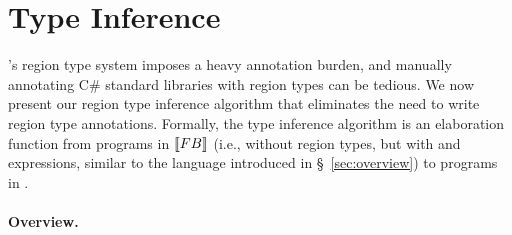 \section{Type Inference}
\label{sec:type-inference}

\name's region type system imposes a heavy annotation burden, and
manually annotating C\# standard libraries with region types
can be tedious. We now present our region type inference algorithm
that eliminates the need to write region type annotations.
Formally, the type inference
algorithm is an elaboration function from programs in $\llbracket {\sc FB} \rrbracket$
(i.e., \FB without region types, but with  and 
expressions, similar to the language introduced in
\S~\ref{sec:overview}) to programs in \FB.

\paragraph{Overview.}

